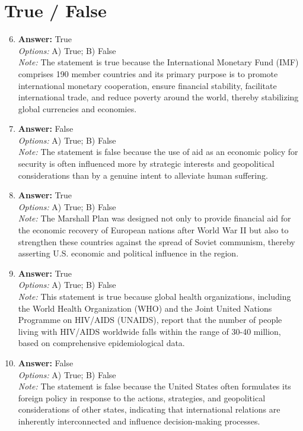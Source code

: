 \documentclass[12pt]{article}
\begin{document}
\section*{True / False}
\begin{enumerate}[label=\arabic*.]
\setcounter{enumi}{5}
\item \textbf{Answer:} True
\\ \textit{Options:} A) True; B) False
\\ \textit{Note:} The statement is true because the International Monetary Fund (IMF) comprises 190 member countries and its primary purpose is to promote international monetary cooperation, ensure financial stability, facilitate international trade, and reduce poverty around the world, thereby stabilizing global currencies and economies.
\item \textbf{Answer:} False
\\ \textit{Options:} A) True; B) False
\\ \textit{Note:} The statement is false because the use of aid as an economic policy for security is often influenced more by strategic interests and geopolitical considerations than by a genuine intent to alleviate human suffering.
\item \textbf{Answer:} True
\\ \textit{Options:} A) True; B) False
\\ \textit{Note:} The Marshall Plan was designed not only to provide financial aid for the economic recovery of European nations after World War II but also to strengthen these countries against the spread of Soviet communism, thereby asserting U.S. economic and political influence in the region.
\item \textbf{Answer:} True
\\ \textit{Options:} A) True; B) False
\\ \textit{Note:} This statement is true because global health organizations, including the World Health Organization (WHO) and the Joint United Nations Programme on HIV/AIDS (UNAIDS), report that the number of people living with HIV/AIDS worldwide falls within the range of 30-40 million, based on comprehensive epidemiological data.
\item \textbf{Answer:} False
\\ \textit{Options:} A) True; B) False
\\ \textit{Note:} The statement is false because the United States often formulates its foreign policy in response to the actions, strategies, and geopolitical considerations of other states, indicating that international relations are inherently interconnected and influence decision-making processes.
\end{enumerate}
\end{document}

